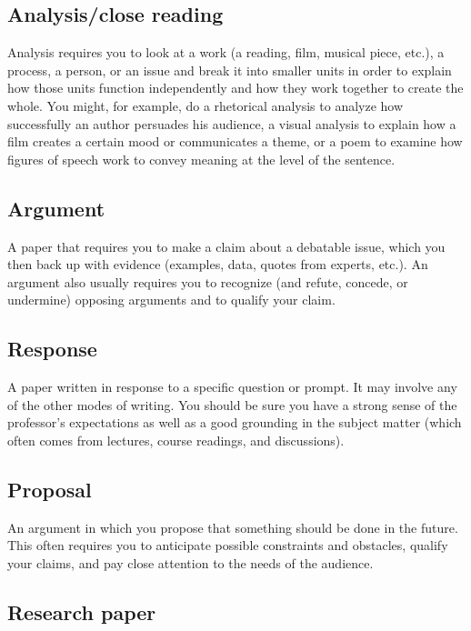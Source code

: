 \documentclass[12pt, hidelinks]{article} %
\begin{document}
\subsection{Analysis/close reading}
Analysis requires you to look at a work (a reading, film, musical piece, etc.), a process, a person, or an issue and break it into smaller units in order to explain how those units function independently and how they work together to create the whole. You might, for example, do a rhetorical analysis to analyze how successfully an author persuades his audience, a visual analysis to explain how a film creates a certain mood or communicates a theme, or a poem to examine how figures of speech work to convey meaning at the level of the sentence.

\subsection{Argument}

A paper that requires you to make a claim about a debatable issue, which you then back up with evidence (examples, data, quotes from experts, etc.). An argument also usually requires you to recognize (and refute, concede, or undermine) opposing arguments and to qualify your claim.

\subsection{Response}

A paper written in response to a specific question or prompt. It may involve any of the other modes of writing. You should be sure you have a strong sense of the professor's expectations as well as a good grounding in the subject matter (which often comes from lectures, course readings, and discussions).

\subsection{Proposal}

An argument in which you propose that something should be done in the future. This often requires you to anticipate possible constraints and obstacles, qualify your claims, and pay close attention to the needs of the audience.

\subsection{Research paper}
\end{document}
